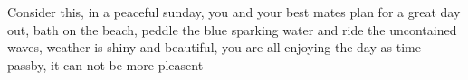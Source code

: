 Consider this, in a peaceful sunday, you and your best mates plan for a great day out, bath on the beach, peddle the blue sparking water and ride the uncontained waves, weather is shiny and beautiful,  you are all enjoying the day as time passby, it can not be more pleasent 